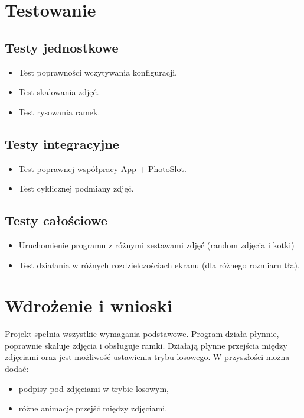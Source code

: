 \documentclass[12pt]{article}
\begin{document}
\section{Testowanie}
\subsection{Testy jednostkowe}
\begin{itemize}
    \item Test poprawności wczytywania konfiguracji.
    \item Test skalowania zdjęć.
    \item Test rysowania ramek.
\end{itemize}

\subsection{Testy integracyjne}
\begin{itemize}
    \item Test poprawnej współpracy App + PhotoSlot.
    \item Test cyklicznej podmiany zdjęć.
\end{itemize}

\subsection{Testy całościowe}
\begin{itemize}
    \item Uruchomienie programu z różnymi zestawami zdjęć (random zdjęcia i kotki)
    \item Test działania w różnych rozdzielczościach ekranu (dla różnego rozmiaru tła).
\end{itemize}

\section{Wdrożenie i wnioski}
Projekt spełnia wszystkie wymagania podstawowe. Program działa płynnie, poprawnie skaluje zdjęcia i obsługuje ramki. Działają płynne przejścia między zdjęciami oraz jest możliwość ustawienia trybu losowego. W przyszłości można dodać:
\begin{itemize}
    \item podpisy pod zdjęciami w trybie losowym,
    \item różne animacje przejść między zdjęciami.
\end{itemize}
\end{document}
